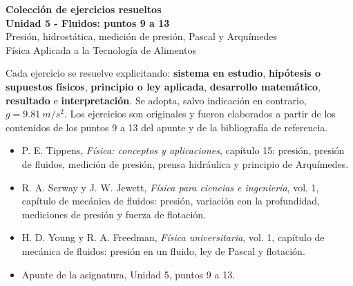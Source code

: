 \documentclass[11pt,a4paper]{article}
\begin{document}
\begin{center}
{\Large\bfseries Colección de ejercicios resueltos}\\[3pt]
{\LARGE\bfseries Unidad 5 - Fluidos: puntos 9 a 13}\\[6pt]
{\large Presión, hidrostática, medición de presión, Pascal y Arquímedes}\\[8pt]
Física Aplicada a la Tecnología de Alimentos
\end{center}
\vspace{4mm}

\begin{tcolorbox}[colback=white,colframe=utnblue,title=Criterio de resolución,fonttitle=\bfseries]
Cada ejercicio se resuelve explicitando: \textbf{sistema en estudio}, \textbf{hipótesis o supuestos físicos}, \textbf{principio o ley aplicada}, \textbf{desarrollo matemático}, \textbf{resultado} e \textbf{interpretación}. Se adopta, salvo indicación en contrario, $g=\SI{9.81}{m/s^2}$. Los ejercicios son originales y fueron elaborados a partir de los contenidos de los puntos 9 a 13 del apunte y de la bibliografía de referencia.
\end{tcolorbox}

\begin{tcolorbox}[colback=lightblue,colframe=blue!60!black,title=Base bibliográfica,fonttitle=\bfseries]
\begin{itemize}
\item P. E. Tippens, \emph{Física: conceptos y aplicaciones}, capítulo 15: presión, presión de fluidos, medición de presión, prensa hidráulica y principio de Arquímedes.
\item R. A. Serway y J. W. Jewett, \emph{Física para ciencias e ingeniería}, vol. 1, capítulo de mecánica de fluidos: presión, variación con la profundidad, mediciones de presión y fuerza de flotación.
\item H. D. Young y R. A. Freedman, \emph{Física universitaria}, vol. 1, capítulo de mecánica de fluidos: presión en un fluido, ley de Pascal y flotación.
\item Apunte de la asignatura, Unidad 5, puntos 9 a 13.
\end{itemize}
\end{tcolorbox}

\tableofcontents
\clearpage
\end{document}
